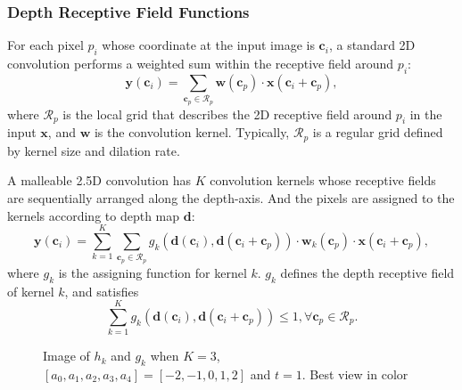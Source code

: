 \documentclass[runningheads]{llncs}
\begin{document}
\subsubsection{Depth Receptive Field Functions}
For each pixel $p_i$ whose coordinate at the input image is $\mathbf{c}_i$, a standard 2D convolution performs a weighted sum within the receptive field around $p_i$:
\begin{equation}
  \mathbf{y}(\mathbf{c}_i) = \sum_{\mathbf{c}_p\in\mathcal{R}_p}\mathbf{w}(\mathbf{c}_p)\cdot\mathbf{x}(\mathbf{c}_i+\mathbf{c}_p),
\end{equation}
where $\mathcal{R}_p$ is the local grid that describes the 2D receptive field around $p_i$ in the input $\mathbf{x}$, and $\mathbf{w}$ is the convolution kernel.
Typically, $\mathcal{R}_p$ is a regular grid defined by kernel size and dilation rate.

A malleable 2.5D convolution has $K$ convolution kernels whose receptive fields are sequentially arranged along the depth-axis.
And the pixels are assigned to the kernels according to depth map $\mathbf{d}$:
\begin{equation}
   \mathbf{y}(\mathbf{c}_i) =
   \sum_{k=1}^K
   \sum_{\mathbf{c}_p\in\mathcal{R}_p}
   g_k(\mathbf{d}(\mathbf{c}_i), \mathbf{d}(\mathbf{c}_i+\mathbf{c}_p))
   \cdot
   \mathbf{w}_k(\mathbf{c}_p)
   \cdot
   \mathbf{x}(\mathbf{c}_i+\mathbf{c}_p),
   \label{eq:sum_kernel}
\end{equation}
where $g_k$ is the assigning function for kernel $k$.
$g_k$ defines the depth receptive field of kernel $k$, and satisfies
\begin{equation}
  \sum_{k=1}^Kg_k(\mathbf{d}(\mathbf{c}_i), \mathbf{d}(\mathbf{c}_i+\mathbf{c}_p)) \leq 1, \forall\mathbf{c}_p\in\mathcal{R}_p.
\end{equation}

\begin{figure}[tbp]
  \centering
  \caption{
    Image of $h_k$ and $g_k$ when $K=3$, $[a_0, a_1, a_2, a_3, a_4]=[-2,-1,0,1,2]$ and $t=1$.
    Best view in color
  }
  \label{fig:receptive_field_funcs_eg}
\end{figure}
\end{document}
